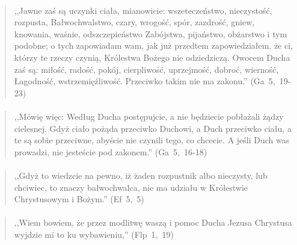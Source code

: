 \documentclass[10pt,a4paper,oneside]{article}
\begin{document}
\paragraph{}
\begin{quote}
,,Jawne zaś są uczynki ciała, mianowicie: wszeteczeństwo, nieczystość, rozpusta, Bałwochwalstwo, czary, wrogość, spór, zazdrość, gniew, knowania, waśnie, odszczepieństwo Zabójstwa, pijaństwo, obżarstwo i tym podobne; o tych zapowiadam wam, jak już przedtem zapowiedziałem, że ci, którzy te rzeczy czynią, Królestwa Bożego nie odziedziczą. Owocem Ducha zaś są: miłość, radość, pokój, cierpliwość, uprzejmość, dobroć, wierność, Łagodność, wstrzemięźliwość. Przeciwko takim nie ma zakonu.'' \mbox{(Ga 5, 19-23)}
\end{quote}
\paragraph{}
\begin{quote}
,,Mówię więc: Według Ducha postępujcie, a nie będziecie pobłażali żądzy cielesnej. Gdyż ciało pożąda przeciwko Duchowi, a Duch przeciwko ciału, a te są sobie przeciwne, abyście nie czynili tego, co chcecie. A jeśli Duch was prowadzi, nie jesteście pod zakonem.'' \mbox{(Ga 5, 16-18)}
\end{quote}
\paragraph{}
\begin{quote}
,,Gdyż to wiedzcie na pewno, iż żaden rozpustnik albo nieczysty, lub chciwiec, to znaczy bałwochwalca, nie ma udziału w Królestwie Chrystusowym i Bożym.'' \mbox{(Ef 5, 5)}
\end{quote}
\paragraph{}
\begin{quote}
,,Wiem bowiem, że przez modlitwę waszą i pomoc Ducha Jezusa Chrystusa wyjdzie mi to ku wybawieniu,'' \mbox{(Flp 1, 19)}
\end{quote}
\end{document}
